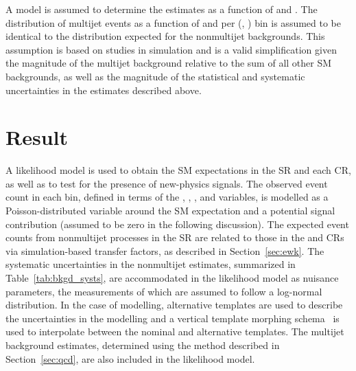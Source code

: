 A model is assumed to determine the estimates as a function of \nb and
\mht. The distribution of multijet events as a function of \nb and
\mht per (\njet, \scalht) bin is assumed to be identical to the
distribution expected for the nonmultijet backgrounds. This assumption
is based on studies in simulation %
and is a valid simplification given the magnitude of the multijet
background relative to the sum of all other SM backgrounds, as well as
the magnitude of the statistical and systematic uncertainties in the
estimates described above.


\section{Result}
\label{sec:result}


A likelihood model is used to obtain the SM expectations in the SR and
each CR, as well as to test for the presence of new-physics
signals. The observed event count in each bin, defined in terms of the
\njet, \nb, \scalht, and \mht variables, is modelled as a
Poisson-distributed variable around the SM expectation and a potential
signal contribution (assumed to be zero in the following
discussion). The expected event counts from nonmultijet processes in
the SR are related to those in the \mj and \mmj CRs via
simulation-based transfer factors, as described in
Section~\ref{sec:ewk}. The systematic uncertainties in the nonmultijet
estimates, summarized in Table~\ref{tab:bkgd_systs}, are accommodated
in the likelihood model as nuisance parameters, the measurements of
which are assumed to follow a log-normal distribution. In the case of
\mht modelling, alternative templates are used to describe the
uncertainties in the \mht modelling and a vertical template morphing
schema~\cite{Prosper:2011zz, Khachatryan:2016dvc} is used to
interpolate between the nominal and alternative templates. The
multijet background estimates, determined using the method described
in Section~\ref{sec:qcd}, are also included in the likelihood model.


